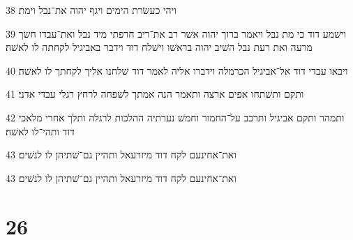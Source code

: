 \par 38 ויהי כעשׂרת הימים ויגף יהוה את־נבל וימת׃
\par 39 וישׁמע דוד כי מת נבל ויאמר ברוך יהוה אשׁר רב את־ריב חרפתי מיד נבל ואת־עבדו חשׂך מרעה ואת רעת נבל השׁיב יהוה בראשׁו וישׁלח דוד וידבר באביגיל לקחתה לו לאשׁה׃
\par 40 ויבאו עבדי דוד אל־אביגיל הכרמלה וידברו אליה לאמר דוד שׁלחנו אליך לקחתך לו לאשׁה׃
\par 41 ותקם ותשׁתחו אפים ארצה ותאמר הנה אמתך לשׁפחה לרחץ רגלי עבדי אדני׃
\par 42 ותמהר ותקם אביגיל ותרכב על־החמור וחמשׁ נערתיה ההלכות לרגלה ותלך אחרי מלאכי דוד ותהי־לו לאשׁה׃
\par 43 ואת־אחינעם לקח דוד מיזרעאל ותהיין גם־שׁתיהן לו לנשׁים׃
\par 43 ואת־אחינעם לקח דוד מיזרעאל ותהיין גם־שׁתיהן לו לנשׁים׃

\chapter{26}

